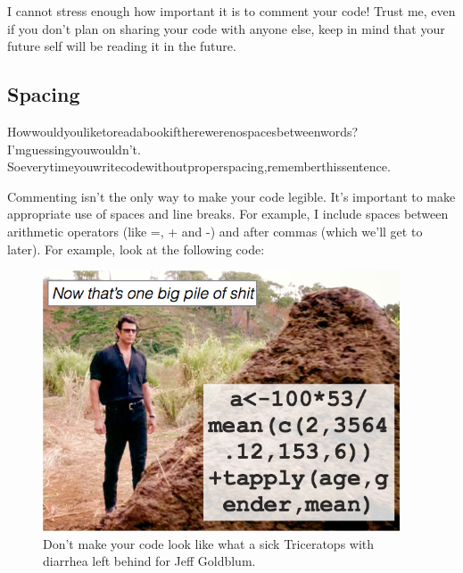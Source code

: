 \documentclass[]{book}
\newenvironment{Shaded}{\begin{snugshade}}{\end{snugshade}}
\newcommand{\KeywordTok}[1]{\textcolor[rgb]{0.13,0.29,0.53}{\textbf{{#1}}}}
\newcommand{\DataTypeTok}[1]{\textcolor[rgb]{0.13,0.29,0.53}{{#1}}}
\newcommand{\StringTok}[1]{\textcolor[rgb]{0.31,0.60,0.02}{{#1}}}
\newcommand{\CommentTok}[1]{\textcolor[rgb]{0.56,0.35,0.01}{\textit{{#1}}}}
\newcommand{\NormalTok}[1]{{#1}}
\theoremstyle{definition}
\theoremstyle{definition}
\theoremstyle{remark}
\begin{document}
\begin{Shaded}
\end{Shaded}

I cannot stress enough how important it is to comment your code! Trust
me, even if you don't plan on sharing your code with anyone else, keep
in mind that your future self will be reading it in the future.

\subsection{Spacing}\label{spacing}

Howwouldyouliketoreadabookiftherewerenospacesbetweenwords?
I'mguessingyouwouldn't.
Soeverytimeyouwritecodewithoutproperspacing,rememberthissentence.

Commenting isn't the only way to make your code legible. It's important
to make appropriate use of spaces and line breaks. For example, I
include spaces between arithmetic operators (like =, + and -) and after
commas (which we'll get to later). For example, look at the following
code:

\begin{figure}

{\centering \includegraphics[width=400px]{images/pileofshit} 

}

\caption{Don't make your code look like what a sick Triceratops with diarrhea left behind for Jeff Goldblum.}\label{fig:pileofshit}
\end{figure}
\end{document}
